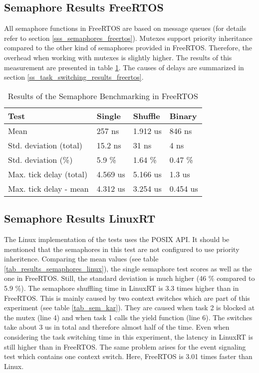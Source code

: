\subsection{Semaphore Results FreeRTOS}
All semaphore functions in FreeRTOS are based on message queues (for details refer to section \ref{sss_semaphores_freertos}).
Mutexes support priority inheritance compared to the other kind of semaphores provided in FreeRTOS.
Therefore, the overhead when working with mutexes is slightly higher. 
The results of this measurement are presented in table \ref{tab_results_semaphores_freertos}. 
The causes of delays are summarized in section \ref{ss_task_switching_results_freertos}.

\begin{table}[htbp]
	\centering
		\begin{tabular}{|l||l|l|l|}
			\hline
				Test 											& Single 		& Shuffle 	& Binary 	  \\
				\hline 
				Mean  										& 257 ns		& 1.912 us	& 846 ns	  \\
			  \hline
			  Std. deviation (total)	  & 15.2 ns		& 31 ns			&	4 ns		  \\
			  \hline
			  Std. deviation (\%)  			& 5.9 \%		& 1.64 \%		&	0.47 \%   \\ 
			  \hline
			  Max. tick delay	(total)		& 4.569 us	& 5.166 us	&	1.3 us    \\
				\hline
				Max. tick delay - mean		&	4.312	us	&	3.254	us	&	0.454 us  \\
			\hline
		\end{tabular}
	\caption{Results of the Semaphore Benchmarking in FreeRTOS}
	\label{tab_results_semaphores_freertos}
\end{table}

\subsection{Semaphore Results LinuxRT}
The Linux implementation of the tests uses the POSIX \ac{API}.
It should be mentioned that the semaphores in this test are not configured to use priority inheritence. 
Comparing the mean values (see table \ref{tab_results_semaphores_linux}), the single semaphore test scores as well as the one in FreeRTOS.
Still, the standard deviation is much higher (46 \% compared to 5.9 \%).
The semaphore shuffling time in LinuxRT is 3.3 times higher than in FreeRTOS.
This is mainly caused by two context switches which are part of this experiment (see table \ref{tab_sem_kar}). 
They are caused when task 2 is blocked at the mutex (line 4) and when task 1 calls the yield function (line 6).
The switches take about 3 us in total and therefore almost half of the time. 
Even when considering the task switching time in this experiment, the latency in LinuxRT is still higher than in FreeRTOS.
The same problem arises for the event signaling test which contains one context switch.
Here, FreeRTOS is 3.01 times faster than Linux. 

